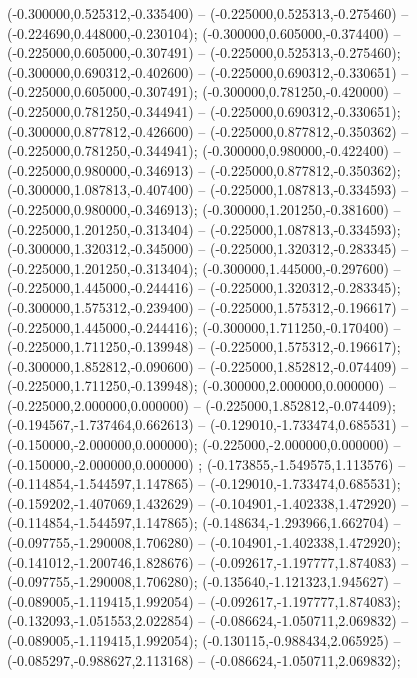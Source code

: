  (-0.300000,0.525312,-0.335400) -- (-0.225000,0.525313,-0.275460) -- (-0.224690,0.448000,-0.230104);
 (-0.300000,0.605000,-0.374400) -- (-0.225000,0.605000,-0.307491) -- (-0.225000,0.525313,-0.275460);
 (-0.300000,0.690312,-0.402600) -- (-0.225000,0.690312,-0.330651) -- (-0.225000,0.605000,-0.307491);
 (-0.300000,0.781250,-0.420000) -- (-0.225000,0.781250,-0.344941) -- (-0.225000,0.690312,-0.330651);
 (-0.300000,0.877812,-0.426600) -- (-0.225000,0.877812,-0.350362) -- (-0.225000,0.781250,-0.344941);
 (-0.300000,0.980000,-0.422400) -- (-0.225000,0.980000,-0.346913) -- (-0.225000,0.877812,-0.350362);
 (-0.300000,1.087813,-0.407400) -- (-0.225000,1.087813,-0.334593) -- (-0.225000,0.980000,-0.346913);
 (-0.300000,1.201250,-0.381600) -- (-0.225000,1.201250,-0.313404) -- (-0.225000,1.087813,-0.334593);
 (-0.300000,1.320312,-0.345000) -- (-0.225000,1.320312,-0.283345) -- (-0.225000,1.201250,-0.313404);
 (-0.300000,1.445000,-0.297600) -- (-0.225000,1.445000,-0.244416) -- (-0.225000,1.320312,-0.283345);
 (-0.300000,1.575312,-0.239400) -- (-0.225000,1.575312,-0.196617) -- (-0.225000,1.445000,-0.244416);
 (-0.300000,1.711250,-0.170400) -- (-0.225000,1.711250,-0.139948) -- (-0.225000,1.575312,-0.196617);
 (-0.300000,1.852812,-0.090600) -- (-0.225000,1.852812,-0.074409) -- (-0.225000,1.711250,-0.139948);
 (-0.300000,2.000000,0.000000) -- (-0.225000,2.000000,0.000000) -- (-0.225000,1.852812,-0.074409);
 (-0.194567,-1.737464,0.662613) -- (-0.129010,-1.733474,0.685531) -- (-0.150000,-2.000000,0.000000);
 (-0.225000,-2.000000,0.000000) -- (-0.150000,-2.000000,0.000000) ;
 (-0.173855,-1.549575,1.113576) -- (-0.114854,-1.544597,1.147865) -- (-0.129010,-1.733474,0.685531);
 (-0.159202,-1.407069,1.432629) -- (-0.104901,-1.402338,1.472920) -- (-0.114854,-1.544597,1.147865);
 (-0.148634,-1.293966,1.662704) -- (-0.097755,-1.290008,1.706280) -- (-0.104901,-1.402338,1.472920);
 (-0.141012,-1.200746,1.828676) -- (-0.092617,-1.197777,1.874083) -- (-0.097755,-1.290008,1.706280);
 (-0.135640,-1.121323,1.945627) -- (-0.089005,-1.119415,1.992054) -- (-0.092617,-1.197777,1.874083);
 (-0.132093,-1.051553,2.022854) -- (-0.086624,-1.050711,2.069832) -- (-0.089005,-1.119415,1.992054);
 (-0.130115,-0.988434,2.065925) -- (-0.085297,-0.988627,2.113168) -- (-0.086624,-1.050711,2.069832);
